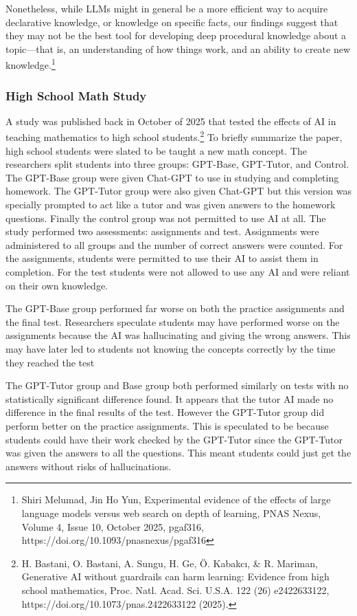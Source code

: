 \documentclass{article}[12pt]
\begin{document}
\begin{displayquote}
Nonetheless, while LLMs might in general be a more efficient way to acquire declarative knowledge, or knowledge on specific facts, our findings suggest that they may not be the best tool for developing deep procedural knowledge about a topic—that is, an understanding of how things work, and an ability to create new knowledge.\footnote{Shiri Melumad, Jin Ho Yun, Experimental evidence of the effects of large language models versus web search on depth of learning, PNAS Nexus, Volume 4, Issue 10, October 2025, pgaf316, https://doi.org/10.1093/pnasnexus/pgaf316}
\end{displayquote}

\subsubsection{High School Math Study}
A study was published back in October of 2025 that tested the effects of AI in teaching mathematics to high school students.\footnote{H. Bastani, O. Bastani, A. Sungu, H. Ge, Ö. Kabakcı, \& R. Mariman, Generative AI without guardrails can harm learning: Evidence from high school mathematics, Proc. Natl. Acad. Sci. U.S.A. 122 (26) e2422633122, https://doi.org/10.1073/pnas.2422633122 (2025).} To briefly summarize the paper, high school students were slated to be taught a new math concept. The researchers split students into three groups: GPT-Base, GPT-Tutor, and Control. The GPT-Base group were given Chat-GPT to use in studying and completing homework. The GPT-Tutor group were also given Chat-GPT but this version was specially prompted to act like a tutor and was given answers to the homework questions. Finally the control group was not permitted to use AI at all. The study performed two assessments: assignments and test. Assignments were administered to all groups and the number of correct answers were counted. For the assignments, students were permitted to use their AI to assist them in completion. For the test students were not allowed to use any AI and were reliant on their own knowledge. 

The GPT-Base group performed far worse on both the practice assignments and the final test. Researchers speculate students may have performed worse on the assignments because the AI was hallucinating and giving the wrong answers. This may have later led to students not knowing the concepts correctly by the time they reached the test

The GPT-Tutor group and Base group both performed similarly on tests with no statistically significant difference found. It appears that the tutor AI made no difference in the final results of the test. However the GPT-Tutor group did perform better on the practice assignments. This is speculated to be because students could have their work checked by the GPT-Tutor since the GPT-Tutor was given the answers to all the questions. This meant students could just get the answers without risks of hallucinations.
\end{document}
